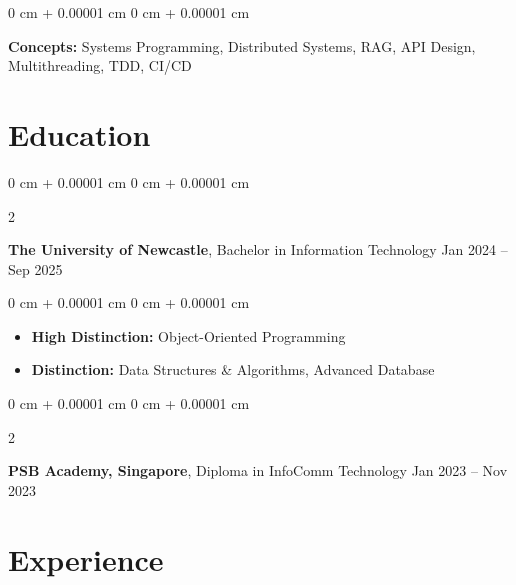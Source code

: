 \documentclass[10pt, letterpaper]{article}
\newenvironment{highlights}{
    \begin{itemize}[
        topsep=0.10 cm,
        parsep=0.10 cm,
        partopsep=0pt,
        itemsep=0pt,
        leftmargin=0 cm + 10pt
    ]
}{
    \end{itemize}
} %
\newenvironment{onecolentry}{
    \begin{adjustwidth}{
        0 cm + 0.00001 cm
    }{
        0 cm + 0.00001 cm
    }
}{
    \end{adjustwidth}
} %
\newenvironment{twocolentry}[2][]{
    \onecolentry
    \def\secondColumn{#2}
    \setcolumnwidth{\fill, 4.5 cm}
    \begin{paracol}{2}
}{
    \switchcolumn \raggedleft \secondColumn
    \end{paracol}
    \endonecolentry
} %
\begin{document}
        \vspace{0.1 cm}
        
        \begin{onecolentry}
            \textbf{Concepts:} Systems Programming, Distributed Systems, RAG, API Design, Multithreading, TDD, CI/CD
        \end{onecolentry}

    \section{Education}
        \begin{twocolentry}{
            Jan 2024 – Sep 2025
        }
        \textbf{The University of Newcastle}, Bachelor in Information Technology\end{twocolentry}
        \vspace{0.10 cm}
        \begin{onecolentry}
            \begin{highlights}
                \item \textbf{High Distinction:} Object-Oriented Programming
            \end{highlights}
            \begin{highlights}
                \item \textbf{Distinction:} Data Structures \& Algorithms, Advanced Database
            \end{highlights}
        \end{onecolentry}

        \vspace{0.20 cm}
        \begin{twocolentry}{
                Jan 2023 – Nov 2023
            }
            \textbf{PSB Academy, Singapore}, Diploma in InfoComm Technology\end{twocolentry}


        
        \section{Experience}        
\end{document}

